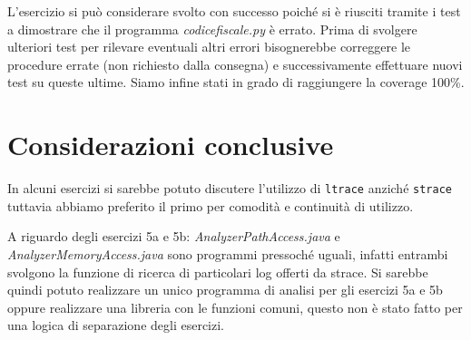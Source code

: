 \documentclass{article}
\newcommand{\filename}[1]{\textit{#1}}
\newcommand{\command}[1]{\texttt{#1}}
\begin{document}
L'esercizio si può considerare svolto con successo poiché si è riusciti tramite i test a dimostrare che il programma \filename{codicefiscale.py} è errato. Prima di svolgere ulteriori test per rilevare eventuali altri errori bisognerebbe correggere le procedure errate (non richiesto dalla consegna) e successivamente effettuare nuovi test su queste ultime. Siamo infine stati in grado di raggiungere la coverage 100\%.



\section{Considerazioni conclusive}

In alcuni esercizi si sarebbe potuto discutere l'utilizzo di \command{ltrace} anziché \command{strace} tuttavia abbiamo preferito il primo per comodità e continuità di utilizzo.

A riguardo degli esercizi 5a e 5b: \filename{AnalyzerPathAccess.java} e \filename{AnalyzerMemoryAccess.java} sono programmi pressoché uguali, infatti entrambi svolgono la funzione di ricerca di particolari log offerti da strace. Si sarebbe quindi potuto realizzare un unico programma di analisi per gli esercizi 5a e 5b oppure realizzare una libreria con le funzioni comuni, questo non è stato fatto per una logica di separazione degli esercizi.


\newpage




\nocite{strace}
\nocite{crawler}
\end{document}
